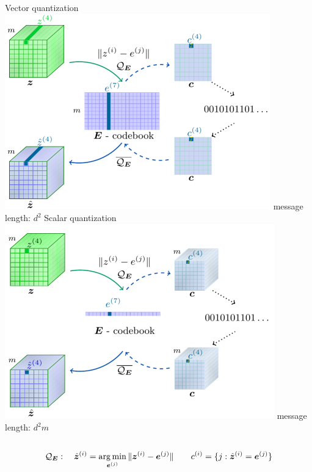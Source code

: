 \documentclass[smaller]{beamer}
\newcommand{\gQE}{\gQ_\mE}
\newcommand{\vzh}{\hat{\vz}}
\begin{document}
\begin{frame}[t]


\vskip 0.5cm

\begin{columns}[c]
\center
Vector quantization
\includegraphics[width=\textwidth]{Pics/quantization_half.png}
\small message length: \alert{$d^2$}
\center
Scalar quantization
\includegraphics[width=\textwidth]{Pics/quantization_scalar_half.png}
\small message length: \alert{$d^2 m$}

\end{columns}

\vskip 0.5cm

\[\gQE: \quad \vzh^{(i)} = \argmin_{\ve^{(j)}} \Vert \vz^{(i)} - \ve^{(j)} \Vert \qquad
\evc^{(i)} = \{j : \vzh^{(i)} = \ve^{(j)} \} \]



\end{frame}
\end{document}
